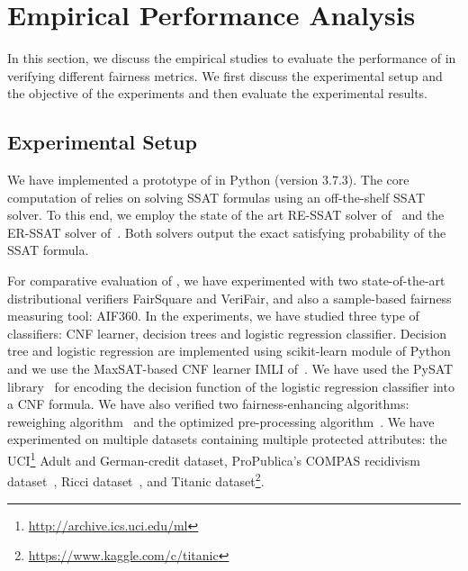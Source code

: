 \section{Empirical Performance Analysis}
\label{fairness_justicia_sec:experiments}
In this section, we discuss the empirical studies to evaluate the performance of {\justicia} in verifying different fairness metrics. We first discuss the experimental setup and the objective of the experiments and then evaluate the experimental results.
\subsection{Experimental Setup}
We have implemented a prototype of {\justicia} in Python (version $ 3.7.3 $). The core computation of {\justicia} relies on solving SSAT formulas using an off-the-shelf SSAT solver. To this end, we employ the state of the art RE-SSAT solver of~\cite{lee2017solving} and the ER-SSAT solver of~\cite{lee2018solving}. Both solvers output the exact  satisfying probability of the SSAT formula. 

For comparative evaluation of {\justicia}, we have experimented with two state-of-the-art distributional verifiers FairSquare and VeriFair, and also a sample-based fairness measuring tool: AIF360. 
In the experiments, we have studied three type of classifiers: CNF learner, decision trees and logistic regression classifier.
Decision tree and logistic regression are implemented using scikit-learn module of Python~\cite{PVGMTGB2011} and we use the MaxSAT-based CNF learner IMLI of~\cite{ghosh19incremental}. We have used the PySAT library~\cite{imms-sat18} for encoding the decision function of the logistic regression classifier into a CNF formula.
We have also verified two fairness-enhancing algorithms: reweighing algorithm~\cite{kamiran2012data} and the optimized pre-processing  algorithm~\cite{calmon2017optimized}. 
We have experimented on multiple datasets containing multiple protected attributes: the UCI\footnote{\url{ http://archive.ics.uci.edu/ml}} Adult and German-credit dataset,  ProPublica’s COMPAS recidivism dataset~\cite{angwin2016machine}, Ricci dataset~\cite{mcginley2010ricci}, and Titanic dataset\footnote{\url{https://www.kaggle.com/c/titanic}}.

